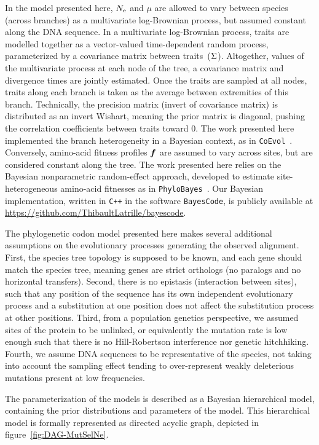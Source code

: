 In the model presented here, $N_{\text{e}}$ and $\mu$ are allowed to vary between species (across branches) as a multivariate log-Brownian process, but assumed constant along the \acrshort{DNA} sequence.
In a multivariate log-Brownian process, traits are modelled together as a vector-valued time-dependent random process, parameterized by a covariance matrix between traits~($\Sigma$).
Altogether, values of the multivariate process at each node of the tree, a covariance matrix and divergence times are jointly estimated.
Once the traits are sampled at all nodes, traits along each branch is taken as the average between extremities of this branch.
Technically, the precision matrix (invert of covariance matrix) is distributed as an invert Wishart, meaning the \gls{prior} matrix is diagonal, pushing the correlation coefficients between traits toward $0$.
The work presented here implemented the branch heterogeneity in a Bayesian context, as in \texttt{CoEvol}~\citep{Lartillot2011}.
Conversely, amino-acid fitness profiles $\bm{f}$ are assumed to vary across sites, but are considered constant along the tree.
The work presented here relies on the Bayesian nonparametric random-effect approach, developed to estimate site-heterogeneous amino-acid fitnesses as in \texttt{PhyloBayes}~\citep{Rodrigue2010}.
Our Bayesian implementation, written in \texttt{C++} in the software \texttt{BayesCode}, is publicly available at \url{https://github.com/ThibaultLatrille/bayescode}.

The phylogenetic \gls{codon} model presented here makes several additional assumptions on the evolutionary processes generating the observed alignment.
First, the species tree topology is supposed to be known, and each gene should match the species tree, meaning genes are strict orthologs (no paralogs and no horizontal transfers).
Second, there is no epistasis (interaction between sites), such that any position of the sequence has its own independent evolutionary process and a \gls{substitution} at one position does not affect the \gls{substitution} process at other positions.
Third, from a population genetics perspective, we assumed sites of the protein to be unlinked, or equivalently the mutation rate is low enough such that there is no Hill-Robertson interference nor genetic hitchhiking.
Fourth, we assume \acrshort{DNA} sequences to be representative of the species, not taking into account the sampling effect tending to over-represent weakly deleterious mutations present at low frequencies.

The parameterization of the models is described as a Bayesian hierarchical model, containing the \gls{prior} distributions and parameters of the model.
This hierarchical model is formally represented as directed acyclic graph, depicted in figure~\ref{fig:DAG-MutSelNe}.

